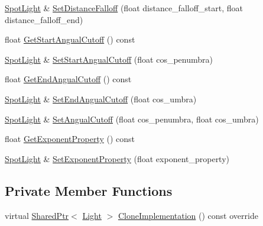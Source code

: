 \begin{DoxyCompactItemize}
\item 
\hyperlink{classmage_1_1_spot_light}{Spot\+Light} \& \hyperlink{classmage_1_1_spot_light_a7321dc4bef165fbaaf9cf4b5781bc00f}{Set\+Distance\+Falloff} (float distance\+\_\+falloff\+\_\+start, float distance\+\_\+falloff\+\_\+end)
\item 
float \hyperlink{classmage_1_1_spot_light_abe143425da28281b7b72643bd2f1c5c2}{Get\+Start\+Angual\+Cutoff} () const
\item 
\hyperlink{classmage_1_1_spot_light}{Spot\+Light} \& \hyperlink{classmage_1_1_spot_light_a9ba061c92fda73430ba268a99a8d3ef6}{Set\+Start\+Angual\+Cutoff} (float cos\+\_\+penumbra)
\item 
float \hyperlink{classmage_1_1_spot_light_ac04202c48cb4c12334f9f55757a3d73a}{Get\+End\+Angual\+Cutoff} () const
\item 
\hyperlink{classmage_1_1_spot_light}{Spot\+Light} \& \hyperlink{classmage_1_1_spot_light_ae89a7a3cdc11ed0f9d2aa825fcf0a07a}{Set\+End\+Angual\+Cutoff} (float cos\+\_\+umbra)
\item 
\hyperlink{classmage_1_1_spot_light}{Spot\+Light} \& \hyperlink{classmage_1_1_spot_light_a128e9e0b9a720f92d16ddd6ca4c31d18}{Set\+Angual\+Cutoff} (float cos\+\_\+penumbra, float cos\+\_\+umbra)
\item 
float \hyperlink{classmage_1_1_spot_light_aaff34ca166a8a129f461579869803aaa}{Get\+Exponent\+Property} () const
\item 
\hyperlink{classmage_1_1_spot_light}{Spot\+Light} \& \hyperlink{classmage_1_1_spot_light_a5a53acd29a7796a16459284dc24b9044}{Set\+Exponent\+Property} (float exponent\+\_\+property)
\end{DoxyCompactItemize}
\subsection*{Private Member Functions}
\begin{DoxyCompactItemize}
\item 
virtual \hyperlink{namespacemage_a1e01ae66713838a7a67d30e44c67703e}{Shared\+Ptr}$<$ \hyperlink{classmage_1_1_light}{Light} $>$ \hyperlink{classmage_1_1_spot_light_a8329b021aeb7caeaa45f0bf06191ef9a}{Clone\+Implementation} () const override
\end{DoxyCompactItemize}
